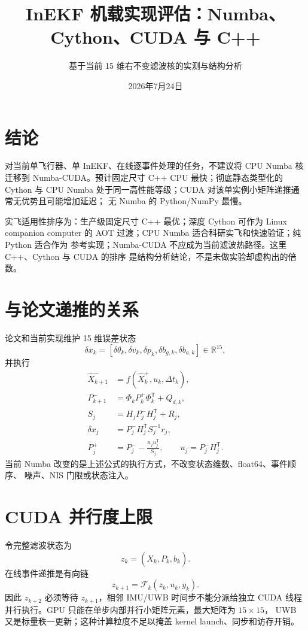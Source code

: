 \documentclass[11pt,a4paper]{ctexart}
\title{InEKF 机载实现评估：Numba、Cython、CUDA 与 C++}
\author{基于当前 15 维右不变滤波核的实测与结构分析}
\date{2026年7月24日}
\begin{document}
\maketitle

\section{结论}

对当前单飞行器、单 InEKF、在线逐事件处理的任务，不建议将 CPU Numba 核迁移到
Numba-CUDA。预计固定尺寸 C++ CPU 最快；彻底静态类型化的 Cython 与 CPU Numba
处于同一高性能等级；CUDA 对该单实例小矩阵递推通常无优势且可能增加延迟；
无 Numba 的 Python/NumPy 最慢。

实飞适用性排序为：生产级固定尺寸 C++ 最优；深度 Cython 可作为 Linux companion
computer 的 AOT 过渡；CPU Numba 适合科研实飞和快速验证；纯 Python 适合作为
参考实现；Numba-CUDA 不应成为当前滤波热路径。这里 C++、Cython 与 CUDA 的排序
是结构分析结论，不是未做实验却虚构出的倍数。

\section{与论文递推的关系}

论文和当前实现维护 15 维误差状态
\begin{equation}
 \delta x_k=
 [\delta\theta_k,\delta v_k,\delta p_k,\delta b_{g,k},\delta b_{a,k}]
 \in\mathbb{R}^{15},
\end{equation}
并执行
\begin{align}
 \hat X_{k+1}^{-}&=f(\hat X_k^{+},u_k,\Delta t_k),\\
 P_{k+1}^{-}&=\Phi_kP_k^{+}\Phi_k^{\mathsf T}+Q_{d,k},\\
 S_j&=H_jP_j^-H_j^{\mathsf T}+R_j,\\
 \delta x_j&=P_j^-H_j^{\mathsf T}S_j^{-1}r_j,\\
 P_j^+&=P_j^--\frac{u_ju_j^{\mathsf T}}{S_j},
 \qquad u_j=P_j^-H_j^{\mathsf T}.
\end{align}
当前 Numba 改变的是上述公式的执行方式，不改变状态维数、float64、事件顺序、
噪声、NIS 门限或状态注入。

\section{CUDA 并行度上限}

令完整滤波状态为
\begin{equation}
 z_k=(\hat X_k,P_k,b_k).
\end{equation}
在线事件递推是有向链
\begin{equation}
 \boxed{z_{k+1}=\mathcal F_k(z_k,u_k,y_k)}.
\end{equation}
因此 $z_{k+2}$ 必须等待 $z_{k+1}$，相邻 IMU/UWB 时间步不能分派给独立 CUDA
线程并行执行。GPU 只能在单步内部并行小矩阵元素，最大矩阵为 $15\times15$，
UWB 又是标量秩一更新；这种计算粒度不足以掩盖 kernel launch、同步和访存开销。
\end{document}
